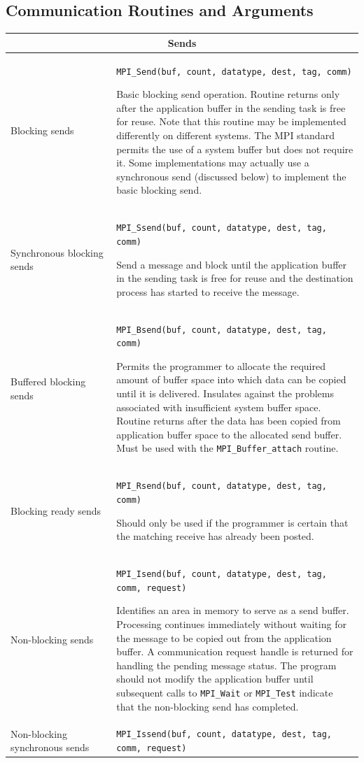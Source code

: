 \subsection{Communication Routines and Arguments}
\begin{tabular}{|p{0.3\linewidth}|p{0.75\linewidth}|}
\hline
\multicolumn{2}{|c|}{\textbf{Sends}} \\
\hline
Blocking sends & \texttt{MPI\_Send(buf, count, datatype, dest, tag, comm)} 

Basic blocking send operation. Routine returns only after the application buffer in the sending task is free for reuse. Note that this routine may be implemented differently on different systems. The MPI standard permits the use of a system buffer but does not require it. Some implementations may actually use a synchronous send (discussed below) to implement the basic blocking send. \\
\hline
Synchronous blocking sends & \texttt{MPI\_Ssend(buf, count, datatype, dest, tag, comm)} 

Send a message and block until the application buffer in the sending task is free for reuse and the destination process has started to receive the message.\\
\hline
Buffered blocking sends & \texttt{MPI\_Bsend(buf, count, datatype, dest, tag, comm)} 

Permits the programmer to allocate the required amount of buffer space into which data can be copied until it is delivered. Insulates against the problems associated with insufficient system buffer space. Routine returns after the data has been copied from application buffer space to the allocated send buffer. Must be used with the \texttt{MPI\_Buffer\_attach} routine. \\
\hline
Blocking ready sends & \texttt{MPI\_Rsend(buf, count, datatype, dest, tag, comm)} 

Should only be used if the programmer is certain that the matching receive has already been posted. \\
\hline
Non-blocking sends &  \texttt{MPI\_Isend(buf, count, datatype, dest, tag, comm, request)} 

Identifies an area in memory to serve as a send buffer. Processing continues immediately without waiting  for  the  message  to  be  copied  out  from  the  application  buffer.  A communication  request handle  is  returned  for  handling  the  pending  message  status.  The  program  should  not  modify  the application  buffer  until  subsequent  calls  to  \texttt{MPI\_Wait}  or  \texttt{MPI\_Test}  indicate  that  the  non-blocking send has completed.   \\
\hline
Non-blocking synchronous sends &  \texttt{MPI\_Issend(buf, count, datatype, dest, tag, comm, request)} 


\end{tabular}
